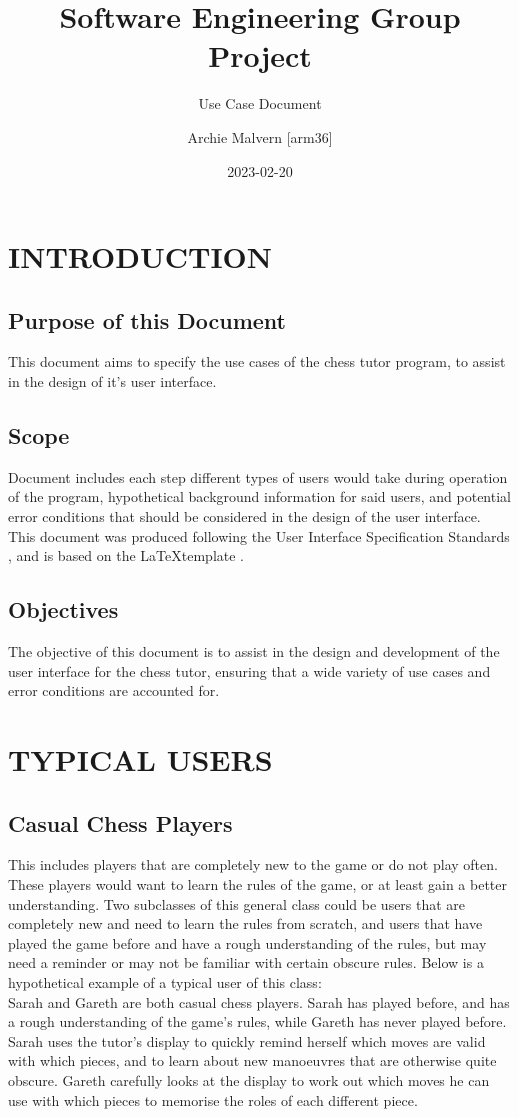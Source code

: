 \documentclass{project}
\begin{document}
\title{Software Engineering Group Project}
\subtitle{Use Case Document}
\author{Archie Malvern [arm36]}
\date{2023-02-20}
\maketitle
\tableofcontents
\newpage
\section{INTRODUCTION}
\subsection{Purpose of this Document}
This document aims to specify the use cases of the chess tutor program, to assist in the design of it’s user interface.
\subsection{Scope}
Document includes each step different types of users would take during operation of the program, hypothetical background information for said users, and potential error conditions that should be considered in the design of the user interface.
This document was produced following the User Interface Specification Standards \cite{se.qa.04}, and is based on the \LaTeX template \cite{SE-N66-TEST}.
\subsection{Objectives}
The objective of this document is to assist in the design and development of the user interface for the chess tutor, ensuring that a wide variety of use cases and error conditions are accounted for.
\section{TYPICAL USERS}
\subsection{Casual Chess Players}
This includes players that are completely new to the game or do not play often. These players would want to learn the rules of the game, or at least gain a better understanding. Two subclasses of this general class could be users that are completely new and need to learn the rules from scratch, and users that have played the game before and have a rough understanding of the rules, but may need a reminder or may not be familiar with certain obscure rules. Below is a hypothetical example of a typical user of this class:\\
Sarah and Gareth are both casual chess players. Sarah has played before, and has a rough understanding of the game’s rules, while Gareth has never played before. Sarah uses the tutor’s display to quickly remind herself which moves are valid with which pieces, and to learn about new manoeuvres that are otherwise quite obscure. Gareth carefully looks at the display to work out which moves he can use with which pieces to memorise the roles of each different piece.
\end{document}
